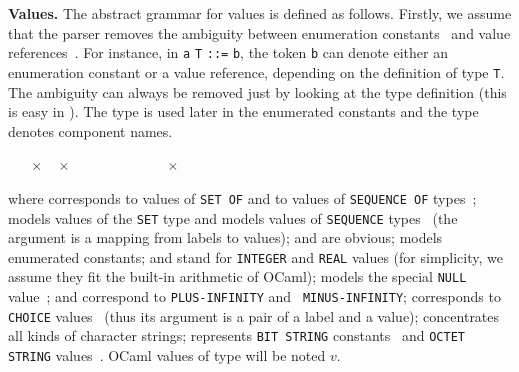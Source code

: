 \medskip

\textbf{Values.} The abstract grammar for \core values is defined as
follows. Firstly, we assume that the parser removes the ambiguity
between enumeration constants~\cite[\S{19}]{X.680:2002} and value
references~\cite[\S{11.4}]{X.680:2002}. For instance, in \texttt{a}
\texttt{\small T} \verb+::=+ \texttt{b}, the token \texttt{b} can
denote either an enumeration constant or a value reference, depending
on the definition of type \texttt{\small T}. The ambiguity can always
be removed just by looking at the type definition (this is easy in
\core). The type  is used later in the enumerated
constants and the type  denotes component names.

\smallskip

\noindent 
\Xtype {} \equal {} \Xand {} \equal
{}

\noindent 
\Xtype {} \equal \lbra\SetOf{} \Xof {}
 \vbar~\SeqOf{} \Xof {} 
\vbar~\Set{} \Xof \lpar{} $\times$ \rpar{}
 \vbar~\Seq{} \Xof \lpar{} $\times$
\rpar{}  \vbar~\True{} \vbar~\False{}
\vbar~\Enum{} \Xof {} \vbar~\Int{} \Xof {}
\vbar~\Real{} \Xof {} \vbar~\Null{} \vbar~\MinusInfinity{}
\vbar~\Chosen{} \Xof {} $\times$ 
\vbar~\pvString{} \Xof {} \vbar~\BitStr{} \Xof {} \vbar~\PlusInfinity{}\rbra

\smallskip

\noindent
where \SetOf{} corresponds to values of \texttt{\small SET OF} and
\SeqOf{} to values of \texttt{\small SEQUENCE OF} types~\cite[\S{25},
\S{27}]{X.680:2002}; \Set{} models values of the \texttt{\small SET}
type and \Seq{} models values of \texttt{\small SEQUENCE}
types~\cite[\S{24}, \S{26}]{X.680:2002} (the argument is a mapping
from labels to values); \True{} and \False{} are obvious; \Enum{}
models enumerated constants; \Int{} and \Real{} stand for
\texttt{\small INTEGER} and \texttt{\small REAL} values (for
simplicity, we assume they fit the built-in arithmetic of OCaml);
\Null{} models the special \texttt{\small NULL}
value~\cite[\S{23}]{X.680:2002}; \PlusInfinity{} and \MinusInfinity{}
correspond to \texttt{\small PLUS-INFINITY} and \texttt{\small
MINUS-INFI\-NI\-TY}; \Chosen{} corresponds to \texttt{\small CHOICE}
values~\cite[\S{28}]{X.680:2002} (thus its argument is a pair of a
label and a value); \pvString{} concentrates all kinds of character
strings; \BitStr{} represents \texttt{\small BIT STRING}
constants~\cite[\S{21}]{X.680:2002} and \texttt{\small OCTET STRING}
values~\cite[\S{22}]{X.680:2002}. OCaml values of type
 will be noted $v$. 

